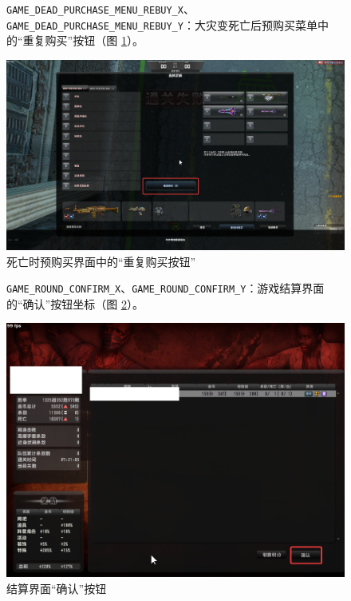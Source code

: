 \begin{figure}[H]
    \Centering
    \parbox[l]{\textwidth}{\lstinline{GAME_DEAD_PURCHASE_MENU_REBUY_X}、\lstinline{GAME_DEAD_PURCHASE_MENU_REBUY_Y}：大灾变死亡后预购买菜单中的“重复购买”按钮（图 \ref{ch2fig-dead-purchase-rebuy}）。}
    \includegraphics[width=\textwidth]{docs/assets/dead_purchase_rebuy.png}
    \caption{死亡时预购买界面中的“重复购买按钮”}
    \label{ch2fig-dead-purchase-rebuy}
\end{figure}

\begin{figure}[H]
    \Centering
    \parbox[l]{\textwidth}{\lstinline{GAME_ROUND_CONFIRM_X}、\lstinline{GAME_ROUND_CONFIRM_Y}：游戏结算界面的“确认”按钮坐标（图 \ref{ch2fig-confirm-round}）。}
    \includegraphics[width=\textwidth]{docs/assets/confirm_round.png}
    \caption{结算界面“确认”按钮}
    \label{ch2fig-confirm-round}
\end{figure}

